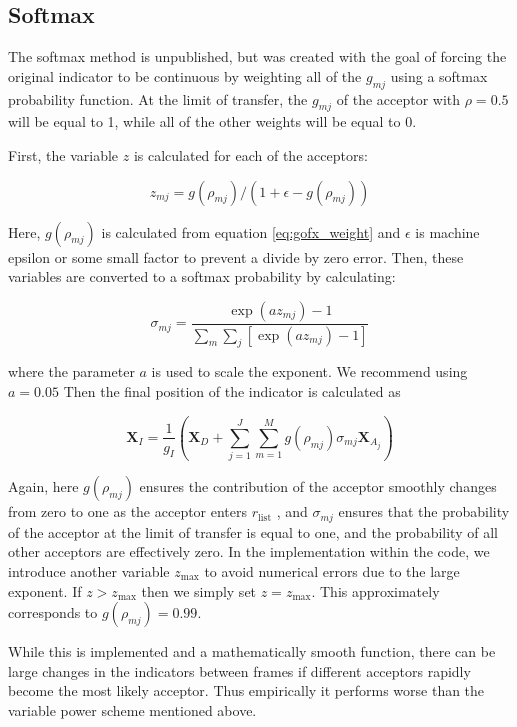 \documentclass{article}
\begin{document}
\subsection{Softmax}\label{ss:indicator13}
The softmax method is unpublished, but was created with the goal of forcing the original indicator to be continuous by weighting all of the $g_{mj}$ using a softmax probability function.
At the limit of transfer, the $g_{mj}$ of the acceptor with $\rho = 0.5$ will be equal to 1, while all of the other weights will be equal to 0.

First, the variable $z$ is calculated for each of the acceptors:

\begin{equation}
z_{mj} = g(\rho_{mj}) / (1 + \epsilon - g(\rho_{mj}) )
\end{equation}

Here, $g(\rho_{mj})$ is calculated from equation \ref{eq:gofx_weight} and $\epsilon$ is machine epsilon or some small factor to prevent a divide by zero error.
Then, these variables are converted to a softmax probability by calculating:

\begin{equation}
\sigma_{mj} = \frac{\exp(a z_{mj}) - 1}{\sum_m \sum_j \left[ \exp(a z_{mj}) - 1 \right] }
\end{equation}

where the parameter $a$ is used to scale the exponent.
We recommend using $a = 0.05$
Then the final position of the indicator is calculated as

\begin{equation}\label{eq:softmax-final}
\mathbf{X}_I = \frac{1}{g_I} \left( \mathbf{X}_D + \sum^{J}_{j=1} \sum^{M}_{m=1} g \left( \rho_{mj} \right) \sigma_{mj} \mathbf{X}_{A_j} \right)
\end{equation}

Again, here $g \left( \rho_{mj} \right)$ ensures the contribution of the acceptor smoothly changes from zero to one as the acceptor enters $r_{\mathrm{list}}$ , and $\sigma_{mj}$ ensures that the probability of the acceptor at the limit of transfer is equal to one, and the probability of all other acceptors are effectively zero.
In the implementation within the code, we introduce another variable $z_{\mathrm{max}}$ to avoid numerical errors due to the large exponent.
If $z > z_{\mathrm{max}}$ then we simply set $z = z_{\mathrm{max}}$.
This approximately corresponds to $g(\rho_{mj}) = 0.99$.

While this is implemented and a mathematically smooth function, there can be large changes in the indicators between frames if different acceptors rapidly become the most likely acceptor.
Thus empirically it performs worse than the variable power scheme mentioned above.
\end{document}
